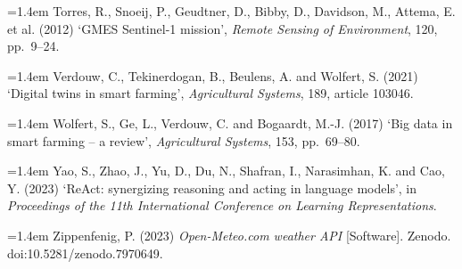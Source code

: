 \documentclass[11pt,a4paper]{article}
\newcommand{\refitem}[1]{\par\noindent\hangindent=1.4em\hangafter=1 #1\par}
\begin{document}
\refitem{Torres, R., Snoeij, P., Geudtner, D., Bibby, D., Davidson, M., Attema, E. et al. (2012) `GMES Sentinel-1 mission', \textit{Remote Sensing of Environment}, 120, pp.\ 9--24.}
\refitem{Verdouw, C., Tekinerdogan, B., Beulens, A. and Wolfert, S. (2021) `Digital twins in smart farming', \textit{Agricultural Systems}, 189, article 103046.}
\refitem{Wolfert, S., Ge, L., Verdouw, C. and Bogaardt, M.-J. (2017) `Big data in smart farming -- a review', \textit{Agricultural Systems}, 153, pp.\ 69--80.}
\refitem{Yao, S., Zhao, J., Yu, D., Du, N., Shafran, I., Narasimhan, K. and Cao, Y. (2023) `ReAct: synergizing reasoning and acting in language models', in \textit{Proceedings of the 11th International Conference on Learning Representations}.}
\refitem{Zippenfenig, P. (2023) \textit{Open-Meteo.com weather API} [Software]. Zenodo. doi:10.5281/zenodo.7970649.}
\end{document}
